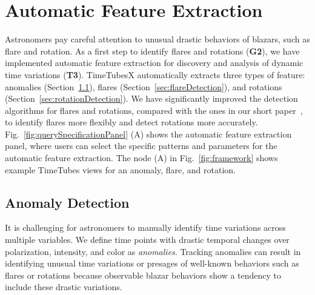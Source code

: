 \section{Automatic Feature Extraction}\label{sec:automaticExtraction}
Astronomers pay careful attention to unusual drastic behaviors of blazars, such as flare and rotation.
As a first step to identify flares and rotations (\textbf{G2}),
we have implemented automatic feature extraction for discovery and analysis of dynamic time variations (\textbf{T3}).
TimeTubesX automatically extracts three types of feature: anomalies (Section~\ref{sec:anomalyDetection}), flares (Section~\ref{sec:flareDetection}), and rotations (Section~\ref{sec:rotationDetection}).
We have significantly improved the detection algorithms for flares and rotations, compared with the ones in our short paper~\cite{Sawada2018}, 
to identify flares more flexibly and detect rotations more accurately.
Fig.~\ref{fig:querySpecificationPanel} (A) shows the automatic feature extraction panel, %
where users can select the specific patterns and parameters for the automatic feature extraction.
The node (A) in Fig.~\ref{fig:framework} shows example TimeTubes views for an anomaly, flare, and rotation.

\subsection{Anomaly Detection}\label{sec:anomalyDetection}
It is challenging for astronomers to manually identify time variations across multiple variables. 
We define time points with drastic temporal changes over polarization, intensity, and color as \textit{anomalies}.
Tracking anomalies can result in identifying unusual time variations or presages of well-known behaviors such as flares or rotations
because observable blazar behaviors show a tendency to include these drastic variations.

